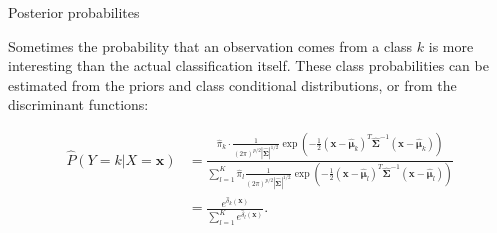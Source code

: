\documentclass[10pt,ignorenonframetext,]{beamer}
\begin{document}
\begin{frame}

\begin{block}{Posterior probabilites}

\vspace{2mm}

Sometimes the probability that an observation comes from a class \(k\)
is more interesting than the actual classification itself. These class
probabilities can be estimated from the priors and class conditional
distributions, or from the discriminant functions:

\begin{align*}\hat{P}(Y=k | X=\boldsymbol{x})&=
\frac{\hat{\pi}_k \cdot \frac{1}{(2 \pi)^{p/2}|\hat{\boldsymbol{\Sigma}}|^{1/2}} \exp(-\frac{1}{2}
(\boldsymbol{x}-\hat{\boldsymbol\mu}_k)^T \hat{\boldsymbol{\Sigma}}^{-1}
(\boldsymbol{x}-\hat{\boldsymbol\mu}_k))}
{\sum_{l=1}^K \hat{\pi}_l 
\frac{1}{(2 \pi)^{p/2}|\hat{\boldsymbol{\Sigma}}|^{1/2}}
\exp(-\frac{1}{2}
(\boldsymbol{x}-\hat{\boldsymbol\mu}_l)^T 
\hat{\boldsymbol{\Sigma}}^{-1}
(\boldsymbol{x}-\hat{\boldsymbol\mu}_l))}\\
&=
\frac{e^{\hat{\delta}_k(\boldsymbol{x})}}{\sum_{l=1}^K e^{\hat{\delta}_l(\boldsymbol{x})}}.\end{align*}

\end{block}

\end{frame}
\end{document}
